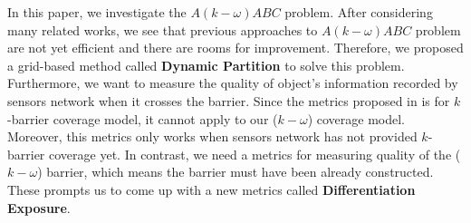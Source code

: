 In this paper, we investigate the $A(k-\omega)ABC$ problem. After considering many related works, we see that previous approaches to $A(k-\omega)ABC$ problem are not yet efficient and there are rooms for improvement. Therefore, we proposed a grid-based method called \textcolor{ProcessBlue}{\bfseries Dynamic Partition} to solve this problem. Furthermore, we want to measure the quality of object's information recorded by sensors network when it crosses the barrier. Since the metrics proposed in \cite{chen2008measuring} is for $k$-barrier coverage model, it cannot apply to our ($k-\omega$) coverage model. Moreover, this metrics only works when sensors network has not provided $k$-barrier coverage yet. In contrast, we need a metrics for measuring quality of the ($k-\omega$) barrier, which means the barrier must have been already constructed. These prompts us to come up with a new metrics called \textcolor{ProcessBlue}{\bfseries Differentiation Exposure}.
